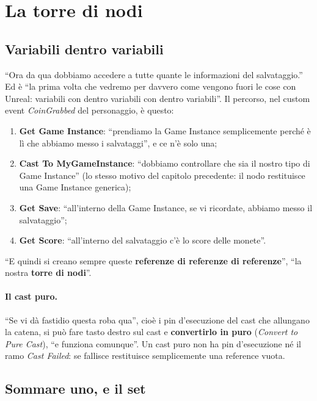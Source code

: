 \section{La torre di nodi}
\label{gd16:sec:torre}

\subsection{Variabili dentro variabili}

``Ora da qua dobbiamo accedere a tutte quante le informazioni del salvataggio.''
Ed è ``la prima volta che vedremo per davvero come vengono fuori le cose con
Unreal: variabili con dentro variabili con dentro variabili''. Il percorso, nel
custom event \emph{CoinGrabbed} del personaggio, è questo:
\begin{enumerate}
  \item \textbf{Get Game Instance}: ``prendiamo la Game Instance semplicemente
        perché è lì che abbiamo messo i salvataggi'', e ce n'è solo una;
  \item \textbf{Cast To MyGameInstance}: ``dobbiamo controllare che sia il nostro
        tipo di Game Instance'' (lo stesso motivo del capitolo precedente: il
        nodo restituisce una Game Instance generica);
  \item \textbf{Get Save}: ``all'interno della Game Instance, se vi ricordate,
        abbiamo messo il salvataggio'';
  \item \textbf{Get Score}: ``all'interno del salvataggio c'è lo score delle
        monete''.
\end{enumerate}
``E quindi si creano sempre queste \textbf{referenze di referenze di
referenze}'', ``la nostra \textbf{torre di nodi}''.

\paragraph{Il cast puro.} ``Se vi dà fastidio questa roba qua'', cioè i pin
d'esecuzione del cast che allungano la catena, si può fare tasto destro sul
cast e \textbf{convertirlo in puro} (\emph{Convert to Pure Cast}), ``e funziona
comunque''. Un cast puro non ha pin d'esecuzione né il ramo \emph{Cast Failed}:
se fallisce restituisce semplicemente una reference vuota.

\subsection{Sommare uno, e il set}

